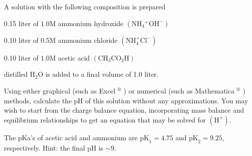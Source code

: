 \documentclass[12pt]{article}
\begin{document}
\section{}
A solution with the following composition is prepared

0.15 liter of $1.0 \mathrm{M}$ ammonium hydroxide $\left(\mathrm{NH}_{4}{ }^{+} \mathrm{OH}^{-}\right)$

0.10 liter of $0.5 \mathrm{M}$ ammonium chloride $\left(\mathrm{NH}_{4}^{+} \mathrm{Cl}^{-}\right)$

0.10 liter of $1.0 \mathrm{M}$ acetic acid $\left(\mathrm{CH}_{3} \mathrm{CO}_{2} \mathrm{H}\right)$

distilled $\mathrm{H}_{2} \mathrm{O}$ is added to a final volume of 1.0 liter.

Using either graphical (such as Excel ${ }^{\circledR}$ ) or numerical (such as Mathematica ${ }^{\circledR}$ ) methods, calculate the $\mathrm{pH}$ of this solution without any approximations. You may wish to start from the charge balance equation, incorporating mass balance and equilibrium relationships to get an equation that may be solved for $\left(\mathrm{H}^{+}\right)$.

The pKa's of acetic acid and ammonium are $\mathrm{pK}_{1}=4.75$ and $\mathrm{pK}_{2}=9.25$, respectively. Hint: the final $\mathrm{pH}$ is $\sim 9$.
\end{document}
